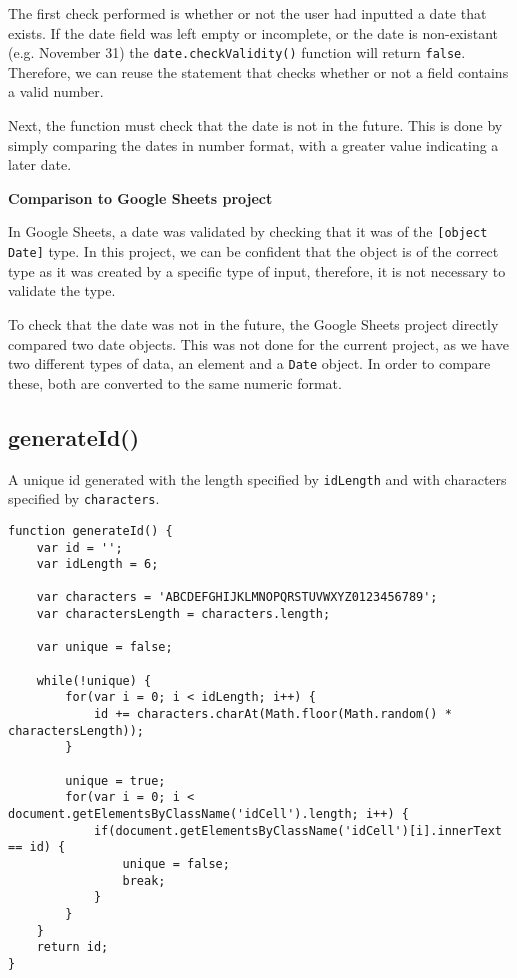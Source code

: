 \documentclass[letterpaper]{article}
\begin{document}
The first check performed is whether or not the user had inputted a date that exists.
If the date field was left empty or incomplete, or the date is non-existant (e.g. November 31) the \lstinline{date.checkValidity()} function will return \lstinline{false}.
Therefore, we can reuse the statement that checks whether or not a field contains a valid number.

Next, the function must check that the date is not in the future.
This is done by simply comparing the dates in number format, with a greater value indicating a later date.

\textbf{Comparison to Google Sheets project}

In Google Sheets, a date was validated by checking that it was of the \lstinline{[object Date]} type.
In this project, we can be confident that the object is of the correct type as it was created by a specific type of input, therefore, it is not necessary to validate the type.

To check that the date was not in the future, the Google Sheets project directly compared two date objects.
This was not done for the current project, as we have two different types of data, an element and a \lstinline{Date} object.
In order to compare these, both are converted to the same numeric format.

\subsection{generateId()}

A unique id generated with the length specified by \lstinline{idLength} and with characters specified by \lstinline{characters}.

\begin{lstlisting}[firstnumber=109]
function generateId() {
    var id = '';
    var idLength = 6;

    var characters = 'ABCDEFGHIJKLMNOPQRSTUVWXYZ0123456789';
    var charactersLength = characters.length;

    var unique = false;

    while(!unique) {
        for(var i = 0; i < idLength; i++) {
            id += characters.charAt(Math.floor(Math.random() * charactersLength));
        }

        unique = true;
        for(var i = 0; i < document.getElementsByClassName('idCell').length; i++) {
            if(document.getElementsByClassName('idCell')[i].innerText == id) {
                unique = false;
                break;
            }
        }
    }
    return id;
}
\end{lstlisting}
\end{document}

